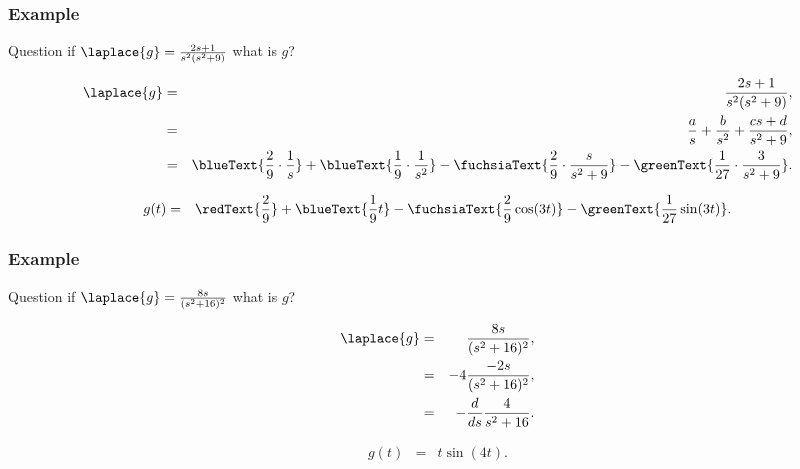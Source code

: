 \begin{frame}
  \frametitle{Example}

  \begin{block}{Question}
    if $\laplace{g}=\frac{2s+1}{s^2(s^2+9)}$ what is $g$?
  \end{block}

    {
      \begin{eqnarray*}
        \laplace{g} & = & \frac{2s+1}{s^2(s^2+9)}, \\
        & = & \frac{a}{s}+\frac{b}{s^2} + \frac{cs+d}{s^2+9}, \\
        & = & \blueText{\frac{2}{9}\cdot\frac{1}{s}} + \blueText{\frac{1}{9}\cdot\frac{1}{s^2}} -
              \fuchsiaText{\frac{2}{9}\cdot\frac{s}{s^2+9}}-\greenText{\frac{1}{27}\cdot\frac{3}{s^2+9}}.
      \end{eqnarray*}
    }

    {
      \begin{eqnarray*}
        g(t) & = & \redText{\frac{2}{9}} + \blueText{\frac{1}{9}t} -
                   \fuchsiaText{\frac{2}{9}\cos(3t)} - \greenText{\frac{1}{27} \sin(3t)}.
      \end{eqnarray*}
    }


\end{frame}


\begin{frame}
  \frametitle{Example}

  \begin{block}{Question}
    if $\laplace{g}=\frac{8s}{(s^2+16)^2}$ what is $g$?
  \end{block}

    {
      \begin{eqnarray*}
        \laplace{g} & = & \frac{8s}{(s^2+16)^2}, \\
        & = & -4 \frac{-2s}{(s^2+16)^2}, \\
        & = & - \frac{d}{ds} \frac{4}{s^2+16}.
      \end{eqnarray*}
    }

    {
      \begin{eqnarray*}
        g(t) & = & t \sin(4t).
      \end{eqnarray*}
    }


\end{frame}

